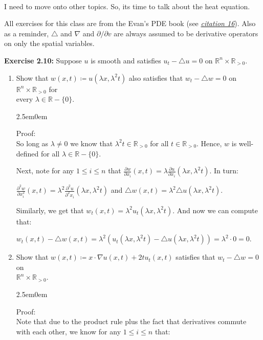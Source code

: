 \documentclass{book}
\newcommand{\inLinkRap}[2]{{\color{blue}\hyperlink{#1}{\textit{#2}}}}
\newcommand{\hTwo}{%
\color{Black}%
   \fontsize{13}{15}\selectfont%
}
\newcommand{\Hstatement}{%
   \color{MidnightBlue!90!Black}%
   \fontsize{12}{13}\selectfont%
}
\newcommand{\HexOne}{%
   \color{Purple}%
   \fontsize{12}{13}\selectfont%
}
\newenvironment{myIndent}{%
   \begin{adjustwidth}{2.5em}{0em}%
}{%
   \end{adjustwidth}%
}
\newcommand{\blab}[1]{\textbf{#1}}
\newcommand{\mySepTwo}[1][.]{%
   {\noindent\color{#1}{\rule{6.5in}{0.5mm}}}\\%
}
\newcommand{\retTwo}{\hfill\bigbreak}
\begin{document}
\hTwo\mySepTwo

I need to move onto other topics. So, its time to talk about the heat equation.\newpage

All exercises for this class are from the Evan's PDE book (see \inLinkRap{Citation 16}{citation 16}). Also as a reminder, $\triangle$ and $\nabla$ and $\partial/\partial v$ are always assumed to be derivative operators on only the spatial variables.\retTwo

\Hstatement\blab{Exercise 2.10:} Suppose $u$ is smooth and satisfies $u_t - \triangle u = 0$ on $\mathbb{R}^n \times \mathbb{R}_{> 0}$.
\begin{enumerate}
	\item[(a)] Show that $w(x, t) \coloneqq u(\lambda x, \lambda^2 t)$ also satisfies that $w_t - \triangle w = 0$ on $\mathbb{R}^n \times \mathbb{R}_{> 0}$ for\\ every $\lambda \in \mathbb{R} - \{0\}$.
	\begin{myIndent}\HexOne
		Proof:\\
		So long as $\lambda \neq 0$ we know that $\lambda^2 t \in \mathbb{R}_{>0}$ for all $t \in \mathbb{R}_{> 0}$. Hence, $w$ is well-defined for all $\lambda \in \mathbb{R} - \{0\}$.\retTwo

		Next, note for any $1 \leq i \leq n$ that $\frac{\partial w}{\partial x_i} (x, t) = \lambda \frac{\partial u}{\partial x_i}(\lambda x, \lambda^2 t)$. In turn:
		
		{\centering$\frac{\partial^2 w}{\partial x_i^2} (x, t) = \lambda^2 \frac{\partial^2 u}{\partial^2 x_i}(\lambda x, \lambda^2 t)$ and $\triangle w(x, t) = \lambda^2 \triangle u(\lambda x, \lambda^2 t)$.\retTwo\par}

		Similarly, we get that $w_t(x, t) = \lambda^2 u_t(\lambda x, \lambda^2 t)$. And now we can compute that:

		{\centering $w_t(x, t) - \triangle w(x, t) = \lambda^2(u_t(\lambda x, \lambda^2 t) - \triangle u(\lambda x, \lambda^2 t)) = \lambda^2 \cdot 0 = 0$. \retTwo\par}
	\end{myIndent}

	\item[(b)] Show that $w(x, t) \coloneqq x \cdot \nabla u(x, t) + 2t u_t(x, t)$ satisfies that $w_t - \triangle w = 0$ on\\ $\mathbb{R}^n \times \mathbb{R}_{>0}$.
	\begin{myIndent}\HexOne
		Proof:\\
		Note that due to the product rule plus the fact that derivatives commute with each other, we know for any $1 \leq i \leq n$ that:


\end{myIndent}
\end{enumerate}
\end{document}

